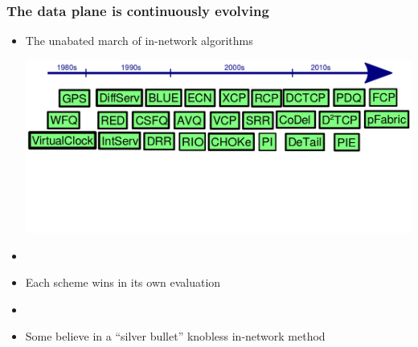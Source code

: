 \begin{frame}[plain]
\frametitle{The data plane is continuously evolving}
\begin{itemize}
\item The unabated march of in-network algorithms
\begin{center}
\noindent \hspace{-.75 cm} \includegraphics[width=.9\textwidth]{march.png}
\end{center}

\item[]
\item Each scheme wins in its own evaluation

\item[]

\item Some believe in a ``silver bullet'' knobless in-network method

\end{itemize}
\end{frame}

